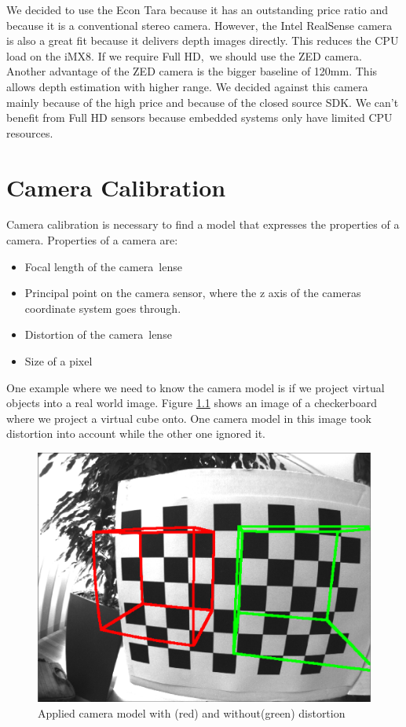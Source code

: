 \documentclass[11pt,a4paper,titlepage,oneside]{report}
\begin{document}
We decided to use the Econ Tara because it has an outstanding price ratio and because it is a conventional stereo camera. However, the Intel RealSense camera is also a great fit because it delivers depth images directly. This reduces the CPU load on the iMX8. If we require Full HD, we should use the ZED camera. Another advantage of the ZED camera is the bigger baseline of 120mm. This allows depth estimation with higher range. We decided against this camera mainly because of the high price and because of the closed source SDK. We can't benefit from Full HD sensors because embedded systems only have limited CPU resources.

\chapter{Camera Calibration}

Camera calibration is necessary to find a model that expresses the properties of a camera. Properties of a camera are:

\begin{itemize}
	\item Focal length of the camera lense
	\item Principal point on the camera sensor, where the z axis of the cameras coordinate system goes through.
	\item Distortion of the camera lense
	\item Size of a pixel
\end{itemize}

One example where we need to know the camera model is if we project virtual objects into a real world image. Figure \ref{fig:model} shows an image of a checkerboard where we project a virtual cube onto. One camera model in this image took distortion into account while the other one ignored it.
\begin{figure}[H]
  \begin{center}
		\includegraphics[width=1.0\textwidth]{img/model.png}
  \end{center}
	\caption{Applied camera model with (red) and without(green) distortion}\label{fig:model}
\end{figure}
\end{document}
